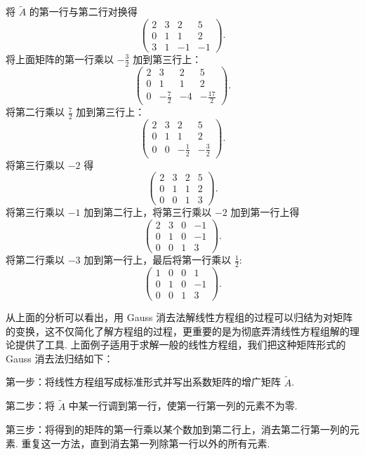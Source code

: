 \documentclass[UTF8,12pt,a4paper,fontset=fandol]{ctexart}
\begin{document}
将 $\widetilde{A}$ 的第一行与第二行对换得
\[
\left(\begin{array}{cccc}
2 & 3 & 2 & 5\\
0 & 1 & 1 & 2\\
3 & 1 & -1 & -1
\end{array}\right).
\]
将上面矩阵的第一行乘以 $-\frac{3}{2}$ 加到第三行上：
\[
\left(\begin{array}{cccc}
2 & 3 & 2 & 5\\
0 & 1 & 1 & 2\\
0 & -\frac{7}{2} & -4 & -\frac{17}{2}
\end{array}\right).
\]
将第二行乘以 $\frac{7}{2}$ 加到第三行上：
\[
\left(\begin{array}{cccc}
2 & 3 & 2 & 5\\
0 & 1 & 1 & 2\\
0 & 0 & -\frac{1}{2} & -\frac{3}{2}
\end{array}\right).
\]
将第三行乘以 $-2$ 得
\[
\left(\begin{array}{cccc}
2 & 3 & 2 & 5\\
0 & 1 & 1 & 2\\
0 & 0 & 1 & 3
\end{array}\right).
\]
将第三行乘以 $-1$ 加到第二行上，将第三行乘以 $-2$ 加到第一行上得
\[
\left(\begin{array}{cccc}
2 & 3 & 0 & -1\\
0 & 1 & 0 & -1\\
0 & 0 & 1 & 3
\end{array}\right).
\]
将第二行乘以 $-3$ 加到第一行上，最后将第一行乘以 $\frac{1}{2}$:
\[
\left(\begin{array}{cccc}
1 & 0 & 0 & 1\\
0 & 1 & 0 & -1\\
0 & 0 & 1 & 3
\end{array}\right).
\]

从上面的分析可以看出，用 Gauss 消去法解线性方程组的过程可以归结为对矩阵的变换，这不仅简化了解方程组的过程，更重要的是为彻底弄清线性方程组解的理论提供了工具. 上面例子适用于求解一般的线性方程组，我们把这种矩阵形式的 Gauss 消去法归结如下：

第一步：将线性方程组写成标准形式并写出系数矩阵的增广矩阵 $\widetilde{A}$.

第二步：将 $\widetilde{A}$ 中某一行调到第一行，使第一行第一列的元素不为零.

第三步：将得到的矩阵的第一行乘以某个数加到第二行上，消去第二行第一列的元素. 重复这一方法，直到消去第一列除第一行以外的所有元素.
\end{document}

